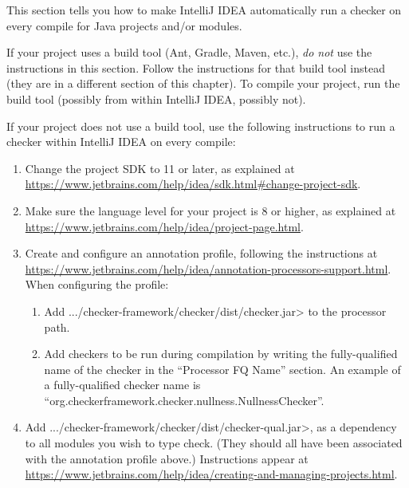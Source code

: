 

This section tells you how to make IntelliJ IDEA automatically run a
checker on every compile for Java projects and/or modules.

If your project uses a build tool (Ant, Gradle, Maven, etc.), \emph{do not}
use the instructions in this section.
Follow the instructions for that build tool instead (they are in
a different section of this chapter).  To compile your project, run the
build tool (possibly from within IntelliJ IDEA, possibly not).



If your project does not use a build tool, use the following instructions
to run a checker within IntelliJ IDEA on every compile:

\begin{enumerate}

\item Change the project SDK to 11 or later, as explained at
  \url{https://www.jetbrains.com/help/idea/sdk.html#change-project-sdk}.

\item Make sure the language level for your project is 8 or higher, as explained at
\url{https://www.jetbrains.com/help/idea/project-page.html}.

\item Create and configure an annotation profile, following the instructions at \url{https://www.jetbrains.com/help/idea/annotation-processors-support.html}.
When configuring the profile:
\begin{enumerate}
\item Add \<.../checker-framework/checker/dist/checker.jar> to the processor path.
\item Add checkers to be run during compilation by writing the
  fully-qualified name of the checker in the ``Processor FQ Name''
  section.  An example of a fully-qualified checker name is
  ``org.checkerframework.checker.nullness.NullnessChecker''.
\end{enumerate}

\item Add \<.../checker-framework/checker/dist/checker-qual.jar>, as a dependency to all
modules you wish to type check. (They should all have been associated with
the annotation profile above.)
Instructions appear at
\url{https://www.jetbrains.com/help/idea/creating-and-managing-projects.html}.

\end{enumerate}

